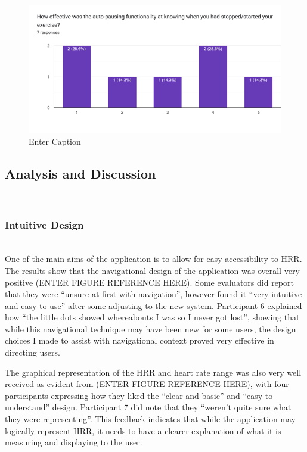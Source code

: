 \documentclass{l4proj}
\begin{document}
\begin{figure}[h!]
    \centering
    \includegraphics[width=0.75\linewidth]{dissertation//dissImages/PauseEffective.png}
    \caption{Enter Caption}
    \label{fig:enter-label}
\end{figure}

\subsection{Analysis and Discussion}

\noindent\mbox{}\\
\subsubsection{Intuitive Design}
\noindent\mbox{}\\

One of the main aims of the application is to allow for easy accessibility to HRR. The results show that the navigational design of the application was overall very positive (ENTER FIGURE REFERENCE HERE). Some evaluators did report that they were “unsure at first with navigation”, however found it “very intuitive and easy to use” after some adjusting to the new system. Participant 6 explained how “the little dots showed whereabouts I was so I never got lost”, showing that while this navigational technique may have been new for some users, the design choices I made to assist with navigational context proved very effective in directing users.

The graphical representation of the HRR and heart rate range was also very well received as evident from (ENTER FIGURE REFERENCE HERE), with four participants expressing how they liked the “clear and basic” and “easy to understand” design. Participant 7 did note that they “weren’t quite sure what they were representing”. This feedback indicates that while the application may logically represent HRR, it needs to have a clearer explanation of what it is measuring and displaying to the user.
\end{document}
